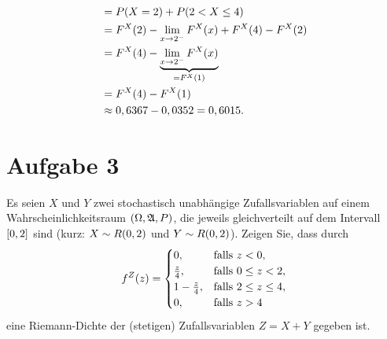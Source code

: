 \documentclass{exercise}
\begin{document}
\begin{enumerate}
\begin{enumerate}
\begin{align*}
                &= P\parentheses*{X = 2} + P\parentheses*{2 < X \le 4}\\
                &= F^X\parentheses*{2} - \lim_{x \to 2^-}F^X\parentheses*{x} + F^{X}\parentheses*{4} - F^X\parentheses*{2}\\
                &= F^X\parentheses*{4} - \underbrace{\lim_{x \to 2^-}F^X\parentheses*{x}}_{= F^X\parentheses*{1}}\\
                &= F^X\parentheses*{4} - F^X\parentheses*{1}\\
                &\approx 0,6367 - 0,0352 = 0,6015.
            \end{align*}
        \end{enumerate} 
    \end{enumerate}


    \section*{Aufgabe 3}

    \begin{problem}
        Es seien \(X\) und \(Y\) zwei stochastisch unabhängige Zufallsvariablen auf einem Wahrscheinlichkeitsraum \(\parentheses*{\Omega, \mathfrak{A}, P}\), die jeweils gleichverteilt auf dem Intervall \(\brackets*{0, 2}\) sind (kurz: \(X \sim R\parentheses*{0, 2}\) und \(Y \sim R\parentheses*{0, 2}\)).
        Zeigen Sie, dass durch
        \[
            f^Z\parentheses*{z} = \begin{cases}
                0, & \text{falls }z < 0,\\
                \frac{z}{4}, & \text{falls }0 \le z < 2,\\
                1 - \frac{z}{4}, & \text{falls }2 \le z \le 4,\\
                0, & \text{falls }z > 4
            \end{cases}
        \]
        eine Riemann-Dichte der (stetigen) Zufallsvariablen \(Z = X + Y\) gegeben ist.
    \end{problem}
\end{document}
